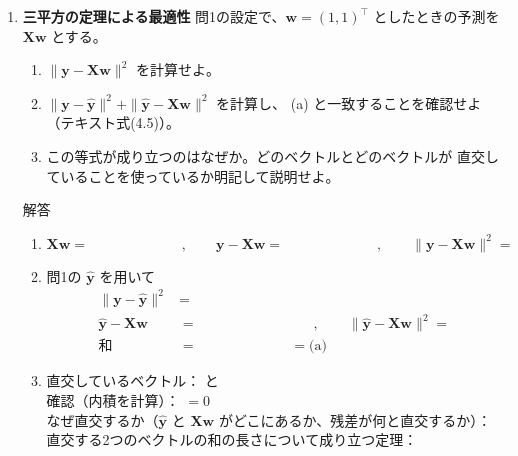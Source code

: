 \documentclass[a4paper,dvipdfmx]{jsarticle}
\newcommand{\提出期限}{2026年10月19日（月）}
\newcommand{\学籍番号}{0000000}
\newcommand{\氏名}{氏名を書く}
\newcommand{\提出日}{2026年10月19日}
\newenvironment{answer}{\begin{itembox}[l]{解答}}{\end{itembox}}
\begin{document}
\begin{enumerate}
  \item \textbf{三平方の定理による最適性}\quad
    問1の設定で、$\bm{w} = (1, 1)^\top$ としたときの予測を $\bm{X}\bm{w}$ とする。
    \begin{enumerate}
      \item $\|\bm{y} - \bm{X}\bm{w}\|^2$ を計算せよ。
      \item $\|\bm{y} - \hat{\bm{y}}\|^2 + \|\hat{\bm{y}} - \bm{X}\bm{w}\|^2$ を計算し、
        (a) と一致することを確認せよ（テキスト式(4.5)）。
      \item この等式が成り立つのはなぜか。どのベクトルとどのベクトルが
        直交していることを使っているか明記して説明せよ。
    \end{enumerate}
    \begin{answer}
      \begin{enumerate}
        \item
          \begin{equation*}
            \bm{X}\bm{w} = \phantom{XXXXXXXX}, \qquad
            \bm{y} - \bm{X}\bm{w} = \phantom{XXXXXXXX}, \qquad
            \|\bm{y} - \bm{X}\bm{w}\|^2 =
          \end{equation*}
        \item 問1の $\hat{\bm{y}}$ を用いて
          \begin{align*}
            \|\bm{y} - \hat{\bm{y}}\|^2 &= \\
            \hat{\bm{y}} - \bm{X}\bm{w} &= \phantom{XXXXXXXXXX}, \qquad
            \|\hat{\bm{y}} - \bm{X}\bm{w}\|^2 = \\
            \text{和} &= \phantom{XXXXXXXX} = \text{(a)}
          \end{align*}
        \item 直交しているベクトル：\phantom{XXXXXXXX} と \phantom{XXXXXXXX} \\[1mm]
          確認（内積を計算）：\phantom{XXXXXXXXXXXXXXXXXXXX} $= 0$ \\[1mm]
          なぜ直交するか（$\hat{\bm{y}}$ と $\bm{X}\bm{w}$ がどこにあるか、残差が何と直交するか）：\\[10mm]
          直交する2つのベクトルの和の長さについて成り立つ定理：
      \end{enumerate}
    \end{answer}


\end{enumerate}
\end{document}

